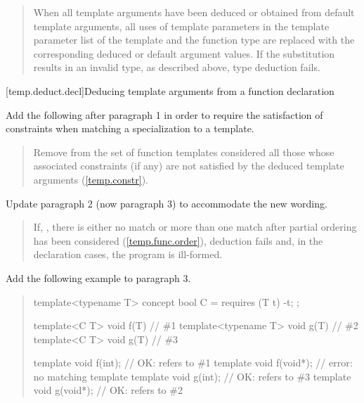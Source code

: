 \begin{quote}
\setcounter{Paras}{4}
\pnum
When all template arguments have been deduced or obtained from default 
template arguments, all uses of template parameters in the template 
parameter list of the template and the function type are replaced with
the corresponding deduced or default argument values. 
% 
If the substitution results in an invalid type, as described above, type 
deduction fails.
% 
\end{quote}

\setcounter{subsubsection}{5}
[temp.deduct.decl]{Deducing template arguments from a function declaration}

Add the following after paragraph 1 in order to require the
satisfaction of constraints when matching a specialization to a
template.

\begin{quote}
\begin{addedblock}
\setcounter{Paras}{2}
\pnum
Remove from the set of function templates considered all those
whose associated constraints (if any) are not satisfied by the deduced
template arguments (\ref{temp.constr}).
\end{addedblock}
\end{quote}

Update paragraph 2 (now paragraph 3) to accommodate the new wording.

\begin{quote}
\pnum
If, 
,
there is either no match or more than one match after partial ordering 
has been considered (\ref{temp.func.order}), deduction fails 
and, in the declaration cases, the program is ill-formed.
\end{quote}

Add the following example to paragraph 3.

\begin{quote}
\enterexample
\begin{codeblock}
template<typename T> concept bool C = requires (T t) { -t; };

template<C T>        void f(T) { } // \#1
template<typename T> void g(T) { } // \#2
template<C T>        void g(T) { } // \#3

template void f(int);   // OK: refers to \#1
template void f(void*); // error: no matching template
template void g(int);   // OK: refers to \#3
template void g(void*); // OK: refers to \#2
\end{codeblock}
\exitexample
\end{quote}
